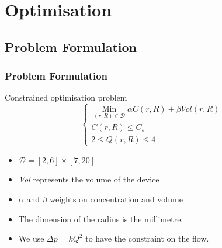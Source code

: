 \documentclass[xcolor=dvipsnames,10pt]{beamer}
\begin{document}

  \section{Optimisation}

  \subsection{Problem Formulation}
  \begin{frame}
  \frametitle{Problem Formulation}
  \begin{block}{Constrained optimisation problem}
  \begin{equation}
	\begin{cases}
  \mathop{Min}\limits _{(r,R)\in \mathcal{D}} \alpha C(r,R) + \beta Vol(r,R) \\
  C(r,R) \leq C_s\\
  2 \leq Q(r,R) \leq 4
	\end{cases}
  \end{equation}
  \end{block}

  \begin{itemize}
  \item $ \mathcal{D} = [2,6] \times [7,20]$
  \item  \emph{Vol} represents the volume of the device
  \item  $\alpha$ and $\beta$ weights on concentration and volume
  \item The dimension of the radius is the millimetre.\\
  \item We use $\Delta p = kQ^2$ to have the constraint on the flow.
  \end{itemize}
  \end{frame}
\end{document}
